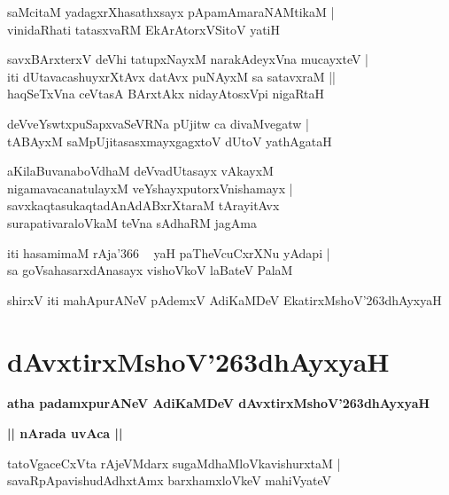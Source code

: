 \documentclass[twoside,12pt,openright]{book}
\def\S{\char'263}
\newcounter{shloka}[chapter]
\def\uvaca#1{\centerline{{\large\textbf{#1}}}}
\begin{document}
\begin{shloka}
saMcitaM yadagxrXhasathxsayx pApamAmaraNAMtikaM |\\
vinidaRhati tatasxvaRM EkArAtorxVSitoV yatiH 
\end{shloka}

\begin{shloka}
savxBArxterxV deVhi tatupxNayxM narakAdeyxVna mucayxteV |\\
iti dUtavacashuyxrXtAvx datAvx puNAyxM sa satavxraM ||\\
haqSeTxVna ceVtasA BArxtAkx nidayAtosxVpi nigaRtaH 
\end{shloka}

\begin{shloka}
deVveYswtxpuSapxvaSeVRNa pUjitw ca divaMvegatw |\\
tABAyxM saMpUjitasasxmayxgagxtoV dUtoV yathAgataH 
\end{shloka}

\begin{shloka}
aKilaBuvanaboVdhaM deVvadUtasayx vAkayxM \\
nigamavacanatulayxM veYshayxputorxVnishamayx |\\
savxkaqtasukaqtadAnAdABxrXtaraM tArayitAvx \\
surapativaraloVkaM teVna sAdhaRM jagAma 
\end{shloka}

\begin{shloka}
iti hasamimaM rAja\char'366 ~ yaH paTheVcuCxrXNu yAdapi |\\
sa goVsahasarxdAnasayx vishoVkoV laBateV PalaM 
\end{shloka}

\begin{center}
shirxV iti mahApurANeV pAdemxV AdiKaMDeV EkatirxMshoV\S dhAyxyaH
\end{center}

\chapter{dAvxtirxMshoV\S dhAyxyaH}

\begin{center}
{\LARGE\bfseries atha padamxpurANeV AdiKaMDeV dAvxtirxMshoV\S dhAyxyaH}
\end{center}

\uvaca{|| nArada uvAca ||}

\begin{shloka}
tatoVgaceCxVta rAjeVMdarx sugaMdhaMloVkavishurxtaM |\\
savaRpApavishudAdhxtAmx barxhamxloVkeV mahiVyateV 
\end{shloka}
\end{document}
